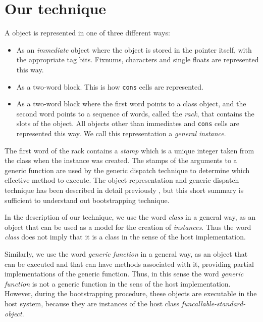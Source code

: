 \section{Our technique}
\label{sec-our-technique}

A \sicl{} object is represented in one of three different ways:

\begin{itemize}
\item As an \emph{immediate} object where the object is stored in the
  pointer itself, with the appropriate tag bits.  Fixnums, characters
  and single floats are represented this way.
\item As a two-word block.  This is how \texttt{cons} cells are
  represented.
\item As a two-word block where the first word points to a class
  object, and the second word points to a sequence of words, called
  the \emph{rack}, that contains the slots of the object.  All objects
  other than immediates and \texttt{cons} cells are represented this
  way.  We call this representation a \emph{general instance}. 
\end{itemize}

The first word of the rack contains a \emph{stamp} which is a unique
integer taken from the class when the instance was created.  The
stamps of the arguments to a generic function are used by the generic
dispatch technique to determine which effective method to execute.
The object representation and generic dispatch technique has been
described in detail previously
\cite{Strandh:2014:FGD:2635648.2635654}, but this short summary is
sufficient to understand out bootstrapping technique.

In the description of our technique, we use the word \emph{class} in a
general way, as an object that can be used as a model for the creation
of \emph{instances}.  Thus the word \emph{class} does not imply that
it is a class in the sense of the host \commonlisp{} implementation.

Similarly, we use the word \emph{generic function} in a general way,
as an object that can be executed and that can have methods associated
with it, providing partial implementations of the generic function.
Thus, in this sense the word \emph{generic function} is not a generic
function in the sens of the host \commonlisp{} implementation.
However, during the bootstrapping procedure, these objects are
executable in the host system, because they are instances of the host
class \emph{funcallable-standard-object}.

